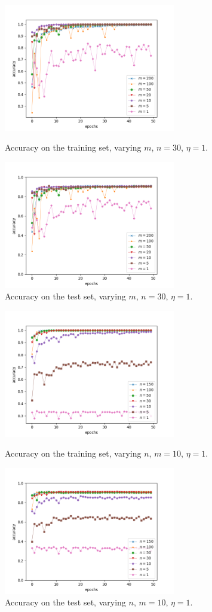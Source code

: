 \documentclass[11pt]{article}
\begin{document}
\begin{figure}[!t]
\centering
\parbox{6cm}{
\includegraphics[width=7.5cm]{delta_m_train.png}
\caption{Accuracy on the training set, varying $m$, $n=30$, $\eta=1$.}
}
\qquad
\begin{minipage}{6cm}
\includegraphics[width=7.5cm]{delta_m_test.png}
\caption{Accuracy on the test set, varying $m$, $n=30$, $\eta=1$.}
\end{minipage}
\end{figure}
\begin{figure}[!b]
\centering
\parbox{6cm}{
\includegraphics[width=7.5cm]{delta_n_train.png}
\caption{Accuracy on the training set, varying $n$, $m=10$, $\eta=1$.}
}
\qquad
\begin{minipage}{6cm}
\includegraphics[width=7.5cm]{delta_n_test.png}
\caption{Accuracy on the test set, varying $n$, $m=10$, $\eta=1$.}
\end{minipage}
\end{figure}
\end{document}
